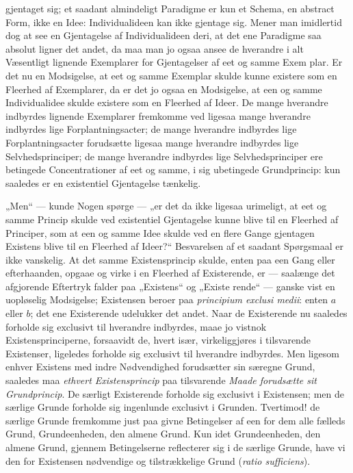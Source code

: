 \documentclass[11pt]{book}
\newcommand{\opage}[1]{\marginnote{\footnotesize\textit{[#1]}}}
\begin{document}
gjentaget sig; et saadant almindeligt Paradigme er kun et Schema, en
abstract Form, ikke en Idee: Individualideen kan ikke gjentage sig.
Mener man imidlertid dog at see en Gjentagelse af Individualideen
deri, at det ene Paradigme saa absolut ligner det andet, da maa man
jo ogsaa ansee de hverandre i alt Væsentligt lignende Exemplarer for
Gjentagelser af eet og samme Exem\-%
\opage{321} \setcounter{footnote}{0}%
plar. Er det nu en Modsigelse, at eet og samme Exemplar skulde
kunne existere som en Fleerhed af Exemplarer, da er det jo ogsaa en
Modsigelse, at een og samme Individualidee skulde existere som en
Fleerhed af Ideer. De mange hverandre indbyrdes lignende
Exemplarer fremkomme ved ligesaa mange hverandre indbyrdes lige
Forplantningsacter; de mange hverandre indbyrdes lige
Forplantningsacter forudsætte ligesaa mange hverandre indbyrdes lige
Selvhedsprinciper; de mange hverandre indbyrdes lige Selvhedsprinciper
ere betingede Concentrationer af eet og samme, i sig ubetingede
Grundprincip: kun saaledes er en existentiel Gjentagelse tænkelig.

„Men“ --- kunde Nogen spørge --- „er det da ikke ligesaa urimeligt,
at eet og samme Princip skulde ved existentiel Gjentagelse kunne blive
til en Fleerhed af Principer, som at een og samme Idee skulde ved en
flere Gange gjentagen Existens blive til en Fleerhed af Ideer?“
Besvarelsen af et saadant Spørgsmaal er ikke vanskelig. At det samme
Existensprincip skulde, enten paa een Gang eller efterhaanden, opgaae
og virke i en Fleerhed af Existerende, er --- saalænge det afgjorende
Eftertryk falder paa „Existens“ og „Existe\-%
rende“ --- ganske vist en uopløselig Modsigelse; Existensen beroer paa
\textit{principium exclusi medii}: enten $a$ eller $b$; det ene
Existerende udelukker det andet. Naar de Existerende nu saaledes
forholde sig exclusivt til hverandre indbyrdes, maae jo vistnok
Existensprinciperne, forsaavidt de, hvert især, virkeliggjøres i
tilsvarende Existenser, ligeledes forholde sig exclusivt til hverandre
indbyrdes. Men ligesom enhver Existens med indre Nødvendighed
forudsætter sin særegne Grund, saaledes maa \emph{ethvert
Existensprincip} paa tilsvarende \emph{Maade forudsætte sit
Grundprincip}. De særligt Existerende forholde sig exclusivt i
Existensen; men de særlige Grunde forholde sig ingenlunde exclusivt i
Grunden. Tvertimod! de særlige Grunde fremkomme just paa givne
Betingelser
\opage{322} \setcounter{footnote}{0}%
af een for dem alle fælleds Grund, Grundeenheden, den almene
Grund. Kun idet Grundeenheden, den almene Grund, gjennem
Betingelserne reflecterer sig i de særlige Grunde, have vi den for
Existensen nødvendige og tilstrækkelige Grund (\textit{ratio
sufficiens}).
\end{document}
